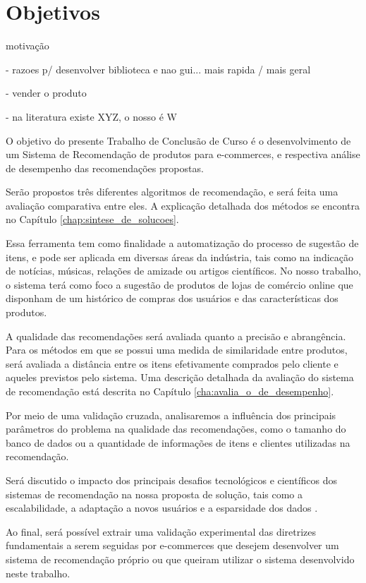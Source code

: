 \chapter[Objetivos]{Objetivos}
\label{chap:objetivos}

motivação

- razoes p/ desenvolver biblioteca e nao gui... mais rapida / mais geral

- vender o produto

- na literatura existe XYZ, o nosso é W


O objetivo do presente Trabalho de Conclusão de Curso é o desenvolvimento de um Sistema de Recomendação de produtos para e-commerces, e respectiva análise de desempenho das recomendações propostas. 

Serão propostos três diferentes algoritmos de recomendação, e será feita uma avaliação comparativa entre eles. A explicação detalhada dos métodos se encontra no Capítulo \ref{chap:sintese_de_solucoes}.

Essa ferramenta tem como finalidade a automatização do processo de sugestão de itens, e pode ser aplicada em diversas áreas da indústria, tais como na indicação de notícias, músicas, relações de amizade ou artigos científicos. No nosso trabalho, o sistema terá como foco a sugestão de produtos de lojas de comércio online que disponham de um histórico de compras dos usuários e das características dos produtos.

A qualidade das recomendações será avaliada quanto a precisão e abrangência. Para os métodos em que se possui uma medida de similaridade entre produtos, será avaliada a distância entre os itens efetivamente comprados pelo cliente e aqueles previstos pelo sistema. Uma descrição detalhada da avaliação do sistema de recomendação está descrita no Capítulo \ref{cha:avalia_o_de_desempenho}.

Por meio de uma validação cruzada, analisaremos a influência dos principais parâmetros do problema na qualidade das recomendações, como o tamanho do banco de dados ou a quantidade de informações de itens e clientes utilizadas na recomendação.

Será discutido o impacto dos principais desafios tecnológicos e científicos dos sistemas de recomendação na nossa proposta de solução, tais como a escalabilidade, a adaptação a novos usuários e a esparsidade dos dados \cite{sarwar2000analysis}.

Ao final, será possível extrair uma validação experimental das diretrizes fundamentais a serem seguidas por e-commerces que desejem desenvolver um sistema de recomendação próprio ou que queiram utilizar o sistema desenvolvido neste trabalho. 
